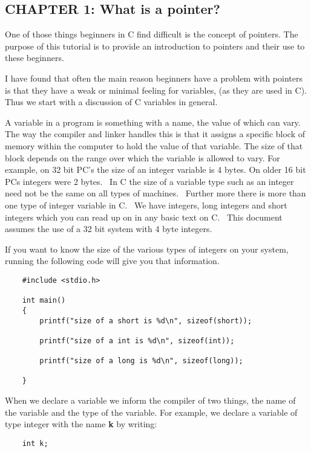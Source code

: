 \hypertarget{chapter-1-what-is-a-pointer}{%
\subsection{CHAPTER 1: What is a
pointer?}\label{chapter-1-what-is-a-pointer}}

One of those things beginners in C find difficult is the concept of
pointers. The purpose of this tutorial is to provide an introduction to
pointers and their use to these beginners.

I have found that often the main reason beginners have a problem with
pointers is that they have a weak or minimal feeling for variables, (as
they are used in C). Thus we start with a discussion of C variables in
general.

A variable in a program is something with a name, the value of which can
vary. The way the compiler and linker handles this is that it assigns a
specific block of memory within the computer to hold the value of that
variable. The size of that block depends on the range over which the
variable is allowed to vary. For example, on 32 bit PC's the size of an
integer variable is 4 bytes. On older 16 bit PCs integers were 2 bytes.~
In C the size of a variable type such as an integer need not be the same
on all types of machines.~ Further more there is more than one type of
integer variable in C.~ We have integers, long integers and short
integers which you can read up on in any basic text on C.~ This document
assumes the use of a 32 bit system with 4 byte integers.

If you want to know the size of the various types of integers on your
system, running the following code will give you that information.

\begin{verbatim}
    #include <stdio.h>
    
    int main()
    {
        printf("size of a short is %d\n", sizeof(short));

        printf("size of a int is %d\n", sizeof(int));

        printf("size of a long is %d\n", sizeof(long));

    }
\end{verbatim}

When we declare a variable we inform the compiler of two things, the
name of the variable and the type of the variable. For example, we
declare a variable of type integer with the name \textbf{k} by writing:

\begin{verbatim}
    int k; 
\end{verbatim}

